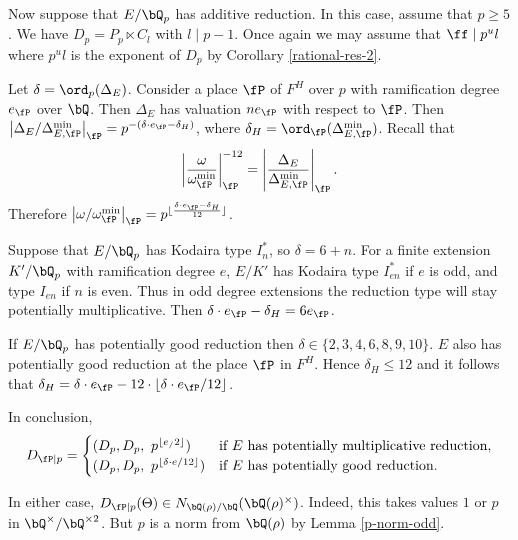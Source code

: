Now suppose that $E / \bQ_p$ has additive reduction. In this case, assume that $p \geq 5$. We have $D_p = P_p \ltimes C_l$ with $ l \mid p - 1$.  
Once again we may assume that $\ff \mid p^u l$ where $p^u l $ is the exponent of $D_p$ by Corollary \ref{rational-res-2}.

Let $\delta = \ord_p(\Delta_E)$. Consider a place $\fP$ of $F^H$ over $p$ with ramification degree  $e_{\fP}$ over $\bQ$. Then $\Delta_E$ has valuation $n e_{\fP}$ with respect to $\fP$. Then $\left| \Delta_E / \Delta_{E, \fP}^{\min} \right|_{\fP} = p^{-(\delta\cdot e_{\fP} - \delta_H)}$, where $\delta_H = \ord_{\fP}(\Delta_{E, \fP}^{\min})$.
Recall that
\[ \left| \frac{\omega}{\omega_{\fP}^{\min}} \right|_{\fP}^{-12} = \left| \frac{\Delta_E}{\Delta_{E, \fP}^{\min}} \right|_{\fP} .\] 
Therefore $\left| \omega / \omega_{\fP}^{\min} \right|_{\fP} = p^{\floor{\frac{\delta\cdot e_{\fP} - \delta_H}{12}}}$.

Suppose that $E / \bQ_p$ has Kodaira type $I_n^*$, so $\delta = 6 + n$. For a finite extension $K' / \bQ_p$ with ramification degree $e$, $E / K'$ has Kodaira type $I_{en}^*$ if $e$ is odd, and type $I_{en}$ if $n$ is even. Thus in odd degree extensions the reduction type will stay potentially multiplicative. Then $\delta \cdot e_{\fP} - \delta_H = 6 e_{\fP}$.

If $E / \bQ_p$ has potentially good reduction then $\delta \in \{2,3,4,6,8,9,10 \}$. $E$ also has potentially good reduction at the place $\fP$ in $F^H$. Hence $\delta_H \leq 12$ and it follows that $\delta_H = \delta \cdot e_\fP - 12 \cdot \floor{\delta \cdot e_\fP /12}$.

In conclusion, 
\[ D_{\fP \mid p} = 
    \begin{cases}
        (D_p, D_p,\ p^{\floor{e_ /2}}) & \text{if } E \text{ has potentially multiplicative reduction}, \\
        (D_p, D_p,\ p^{\floor{\delta \cdot e/12}}) & \text{if } E \text { has potentially good reduction}.
    \end{cases}
    \]

In either case, $D_{\fP \mid p}(\Theta) \in N_{\bQ(\rho) / \bQ}(\bQ(\rho)^{\times})$. Indeed, this takes values $1$ or $p$ in $\bQ^{\times} / \bQ^{\times 2}$. But $p$ is a norm from $\bQ(\rho)$ by Lemma \ref{p-norm-odd}.

\vspace{1em}

